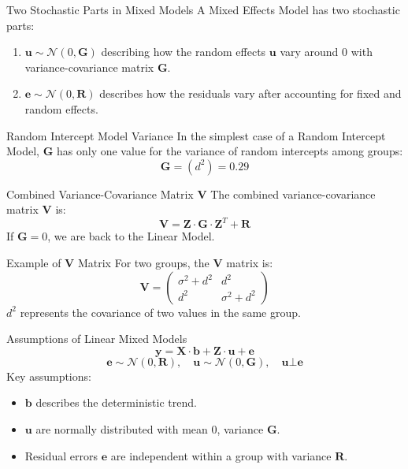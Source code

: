 \documentclass{beamer}
\begin{document}
\begin{frame}{Two Stochastic Parts in Mixed Models}
A Mixed Effects Model has two stochastic parts:
\begin{enumerate}
  \item $\mathbf{u} \sim \mathcal{N}(0, \mathbf{G})$ describing how the random effects $\mathbf{u}$ vary around $0$ with variance-covariance matrix $\mathbf{G}$.
  \item $\mathbf{e} \sim \mathcal{N}(0, \mathbf{R})$ describes how the residuals vary after accounting for fixed and random effects.
\end{enumerate}
\end{frame}

\begin{frame}{Random Intercept Model Variance}
In the simplest case of a Random Intercept Model, $\mathbf{G}$ has only one value for the variance of random intercepts among groups:
\[
\mathbf{G} = \left( d^2 \right) = 0.29
\]
\end{frame}

\begin{frame}{Combined Variance-Covariance Matrix $\mathbf{V}$}
The combined variance-covariance matrix $\mathbf{V}$ is:
\[
\mathbf{V} = \mathbf{Z} \cdot \mathbf{G} \cdot \mathbf{Z}^T + \mathbf{R}
\]
If $\mathbf{G} = 0$, we are back to the Linear Model.
\end{frame}

\begin{frame}{Example of $\mathbf{V}$ Matrix}
For two groups, the $\mathbf{V}$ matrix is:
\[
\mathbf{V} = \left( 
\begin{array}{cc} 
\sigma^2 + d^2 & d^2 \\ 
d^2 & \sigma^2 + d^2 
\end{array} \right)
\]
$d^2$ represents the covariance of two values in the same group.
\end{frame}

\begin{frame}{Assumptions of Linear Mixed Models}
\[
\mathbf{y} = \mathbf{X} \cdot \mathbf{b} + \mathbf{Z} \cdot \mathbf{u} + \mathbf{e}
\]
\[
\mathbf{e} \sim \mathcal{N}(0, \mathbf{R}), \quad \mathbf{u} \sim \mathcal{N}(0, \mathbf{G}), \quad \mathbf{u} \bot \mathbf{e}
\]
Key assumptions:
\begin{itemize}
  \item $\mathbf{b}$ describes the deterministic trend.
  \item $\mathbf{u}$ are normally distributed with mean 0, variance $\mathbf{G}$.
  \item Residual errors $\mathbf{e}$ are independent within a group with variance $\mathbf{R}$.
\end{itemize}
\end{frame}
\end{document}
